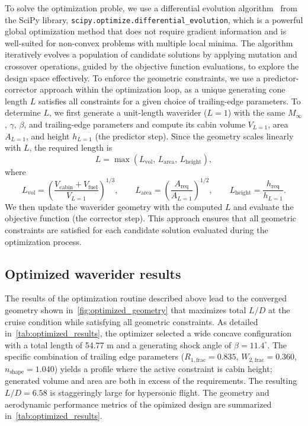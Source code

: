 \documentclass[10pt,a4paper]{article}
\begin{document}
To solve the optimization proble, we use a differential evolution algorithm~\cite{Storn:1997} from the SciPy library, \texttt{scipy.optimize.differential\_evolution}, which is a powerful global optimization method that does not require gradient information and is well-suited for non-convex problems with multiple local minima. The algorithm iteratively evolves a population of candidate solutions by applying mutation and crossover operations, guided by the objective function evaluations, to explore the design space effectively. To enforce the geometric constraints, we use a predictor-corrector approach within the optimization loop, as a unique generating cone length $L$ satisfies all constraints for a given choice of trailing-edge parameters. To determine $L$, we first generate a unit-length waverider ($L=1$) with the same $M_\infty$, $\gamma$, $\beta$, and trailing-edge parameters and compute its cabin volume $V_{L=1}$, area $A_{L=1}$, and height $h_{L=1}$ (the predictor step). Since the geometry scales linearly with $L$, the required length is
\begin{equation}
    L = \max\left(L_{\mathrm{vol}},\,L_{\mathrm{area}},\,L_{\mathrm{height}}\right),
\end{equation}
where
\begin{equation}
    L_{\mathrm{vol}} = \left(\frac{V_{\text{cabin}} + V_{\text{fuel}}}{V_{L=1}}\right)^{1/3},\qquad
    L_{\mathrm{area}} = \left(\frac{A_{\text{req}}}{A_{L=1}}\right)^{1/2},\qquad
    L_{\mathrm{height}} = \frac{h_{\text{req}}}{h_{L=1}}.
\end{equation}
We then update the waverider geometry with the computed $L$ and evaluate the objective function (the corrector step). This approach ensures that all geometric constraints are satisfied for each candidate solution evaluated during the optimization process.

\subsection{Optimized waverider results}

The results of the optimization routine described above lead to the converged geometry shown in~\cref{fig:optimized_geometry} that maximizes total $L/D$ at the cruise condition while satisfying all geometric constraints. As detailed in~\cref{tab:optimized_results}, the optimizer selected a wide concave configuration with a total length of 54.77 m and a generating shock angle of $\beta = 11.4^\circ$. The specific combination of trailing edge parameters ($R_{1, \text{frac}} = 0.835$, $W_{2, \text{frac}} = 0.360$, $n_{\text{shape}} = 1.040$) yields a profile where the active constraint is cabin height; generated volume and area are both in excess of the requirements. The resulting $L/D=6.58$ is staggeringly large for hypersonic flight. The geometry and aerodynamic performance metrics of the opimized design are summarized in~\cref{tab:optimized_results}.
\end{document}
